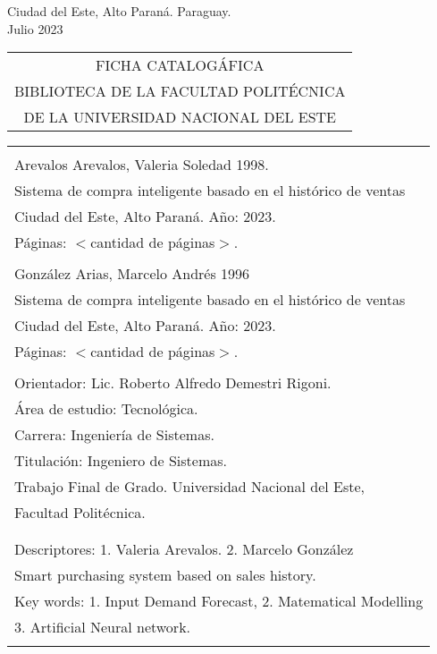 \begin{center}
{\large Ciudad del Este, Alto Paraná. Paraguay.\\[6mm]
Julio 2023}
\end{center}
\newpage \normalsize
\thispagestyle{empty}
\begin{center} 
\begin{tabular}{c} 
  FICHA CATALOGÁFICA \\
  BIBLIOTECA DE LA FACULTAD POLITÉCNICA \\
  DE LA UNIVERSIDAD NACIONAL DEL ESTE \\
\end{tabular} %
\vspace{0.3cm}
\begin{tabular}{|l|} \hline %
  \\
  Arevalos Arevalos, Valeria Soledad 1998.\\
   Sistema de compra inteligente basado en el histórico de ventas  \\
  Ciudad del Este, Alto Paraná. Año: 2023.\\
  Páginas: $<$cantidad de páginas$>$.\\ 
  \\

  González Arias, Marcelo Andrés 1996\\
  Sistema de compra inteligente basado en el histórico de ventas  \\
  Ciudad del Este, Alto Paraná. Año: 2023.\\
  Páginas: $<$cantidad de páginas$>$.\\ 
 \\

  Orientador: Lic. Roberto Alfredo Demestri Rigoni. \\
  
  Área de estudio: Tecnológica. \\
  Carrera: Ingeniería de Sistemas. \\
  Titulación: Ingeniero de Sistemas. \\
  
  Trabajo Final de Grado. Universidad Nacional del Este, \\
  Facultad Politécnica.\\
  \\ \\
  
  Descriptores: 1. Valeria Arevalos. 2. Marcelo González\\
  Smart purchasing system based on sales history. \\
  Key words: 1. Input Demand Forecast, 2. Matematical Modelling \\
  \hspace{2cm} 3. Artificial Neural network.\\
  \\
  \hline
  
\end{tabular}
\end{center}

